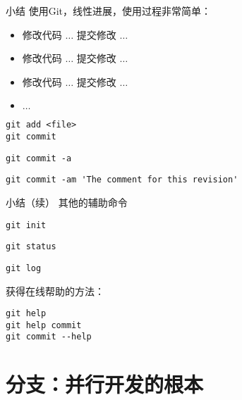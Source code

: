 \begin{frame}[fragile]{小结}
\onslide<+->
使用Git，线性进展，使用过程非常简单：
\onslide<+->
    \begin{itemize}
        \item 修改代码 \(\ldots\) 提交修改 \(\ldots\)
        \item 修改代码 \(\ldots\) 提交修改 \(\ldots\)
        \item 修改代码 \(\ldots\) 提交修改 \(\ldots\)
        \item \(\ldots\)
    \end{itemize}
\onslide<+->
    \begin{Verbatim}[frame=single,commandchars=\\\{\}]
git add <file>
git commit
    \end{Verbatim}
\onslide<+->
    \begin{Verbatim}[frame=single,commandchars=\\\{\}]
git commit -a
    \end{Verbatim}
\onslide<+->
    \begin{Verbatim}[frame=single,commandchars=\\\{\}]
git commit -am 'The comment for this revision'
    \end{Verbatim}
\end{frame}

\begin{frame}[fragile]{小结（续）}
\onslide<+->
其他的辅助命令
\onslide<+->
    \begin{Verbatim}[frame=single,commandchars=\\\{\}]
git init
    \end{Verbatim}
\onslide<+->
    \begin{Verbatim}[frame=single,commandchars=\\\{\}]
git status
    \end{Verbatim}
\onslide<+->
    \begin{Verbatim}[frame=single,commandchars=\\\{\}]
git log
    \end{Verbatim}
\onslide<+->

获得在线帮助的方法：
    \begin{Verbatim}[frame=single,commandchars=\\\{\}]
git help
git help commit
git commit --help
    \end{Verbatim}
\end{frame}


\part{分支：并行开发的根本}

